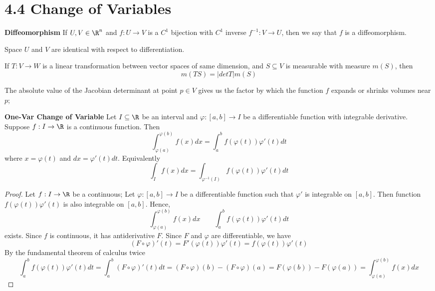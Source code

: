 \documentclass[11pt]{article}
\begin{document}
\section*{4.4 Change of Variables}

\begin{defn*}
  \textbf{Diffeomorphism} If $U,V\in\R^n$ and $f: U\to V$ is a $C^1$ bijection with $C^1$ inverse $f^{-1}:V\to U$, then we say that $f$ is a diffeomorphism.
  \begin{rem}
    Space $U$ and $V$ are identical with respect to differentiation.
  \end{rem}
\end{defn*}

\begin{theorem*}
  If $T: V\to W$ is a linear transformation between vector spaces of same dimension, and $S\subseteq V$ is measurable with measure $m(S)$, then
  \[
    m(TS) = |det T| m(S)
  \]
  \begin{rem}
    The absolute value of the Jacobian determinant at point $p\in V$ gives us the factor by which the function $f$ expands or shrinks volumes near $p$;
  \end{rem}
\end{theorem*}


\begin{theorem*}
  \textbf{One-Var Change of Variable} Let $I\subseteq \R$ be an interval and $\varphi:[a,b]\to I$ be a differentiable function with integrable derivative. Suppose $f: I\to\R$ is a continuous function. Then
  \[
    \int_{\varphi(a)}^{\varphi(b)} f(x)dx = \int_{a}^{b} f(\varphi(t))\varphi'(t) dt
  \]
  where $x = \varphi(t)$ and $dx = \varphi'(t)dt$. Equivalently
  \[
    \int_{I} f(x)dx = \int_{\varphi^{-1}(I)} f(\varphi(t))\varphi'(t) dt
  \]
  \begin{proof}
    Let $f: I\to \R$ be a continuous; Let $\varphi: [a,b]\to I$ be  a differentiable function such that $\varphi'$ is integrable on $[a,b]$. Then function $f(\varphi(t))\varphi'(t)$ is also integrable on $[a,b]$. Hence,
    \[
      \int_{\varphi(a)}^{\varphi(b)} f(x)dx \quad\quad \int_a^b f(\varphi(t))\varphi'(t) dt
    \]
    exists. Since $f$ is continuous, it has antiderivative $F$. Since $F$ and $\varphi$ are differentiable, we have
    \[
      (F \circ \varphi)'(t) = F'(\varphi(t))\varphi'(t) = f(\varphi(t))\varphi'(t)
    \]
    By the fundamental theorem of calculus twice
    \[
      \int_a^b f(\varphi(t))\varphi'(t) dt = \int_a^b (F\circ \varphi)'(t) dt = (F\circ \varphi)(b) - (F\circ \varphi)(a) = F(\varphi(b)) - F(\varphi(a)) = \int_{\varphi(a)}^{\varphi(b)} f(x) dx
    \]
  \end{proof}
\end{theorem*}
\end{document}
